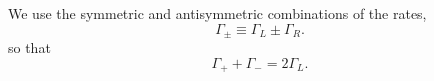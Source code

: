 \documentclass{article}
\begin{document}
We use the symmetric and antisymmetric combinations of the rates,
\begin{equation}
\Gamma_\pm \equiv \Gamma_L \pm \Gamma_R .
\label{eq:gpm}
\end{equation}
so that
\begin{equation}
\Gamma_+ + \Gamma_- = 2\Gamma_L .
\label{eq:sum}
\end{equation}
\end{document}
